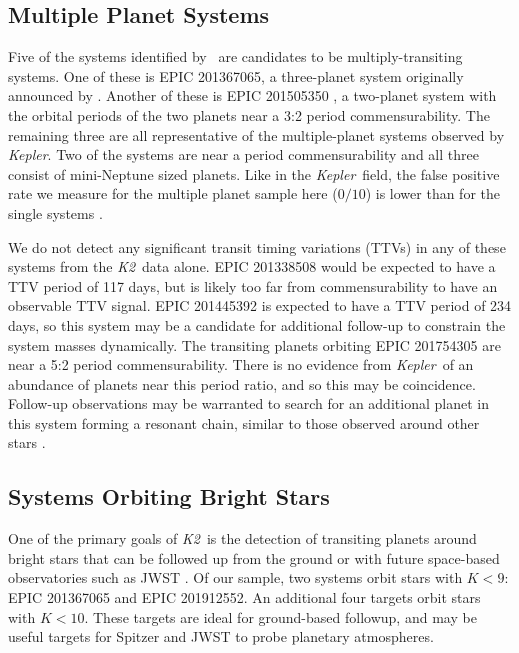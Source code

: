 \documentclass{emulateapj}
\newcommand{\project}[1]{\textsl{#1}}
\newcommand{\kep}{\project{Kepler}}
\newcommand{\KT}{\project{K2}}
\newcommand{\paperit}{\citet{Foreman-Mackey15}}
\begin{document}
\subsection{Multiple Planet Systems}
Five of the systems identified by \paperit\ are candidates to be multiply-transiting
systems.
One of these is EPIC 201367065, a three-planet system originally announced by
\citet{Crossfield15}.
Another of these is EPIC 201505350 \citep{Armstrong15b}, a two-planet system with the
orbital periods of the two planets near a 3:2 period commensurability.
The remaining three are all representative of the multiple-planet systems observed by
\kep \citep{Lissauer11b, Fabrycky14}.
Two of the systems are near a period commensurability and all three consist of
mini-Neptune sized planets.
Like in the \kep\ field, the false positive rate we measure for the multiple planet sample
here ($0/10$) is lower than for the single systems \citep{Lissauer12, Rowe14}.


We do not detect any significant transit timing variations (TTVs) in any of these systems from
the \KT\ data alone.
EPIC 201338508 would be expected to have a TTV period of 117 days, but
is likely too far from commensurability to have an observable TTV signal.
EPIC 201445392 is expected to have a TTV period of 234 days, so this system may be a candidate
for additional follow-up to constrain the system masses dynamically.
The transiting planets orbiting EPIC 201754305 are near a 5:2 period commensurability.
There is no evidence from \kep\ of an abundance of planets near this period ratio, and so this
may be coincidence.
Follow-up observations may be warranted to search for an additional planet in this system
forming a resonant chain, similar to those observed around other stars \citep[e.g.][]{Swift13,
Campante15}.

\subsection{Systems Orbiting Bright Stars}

One of the primary goals of \KT\ is the detection of transiting planets around bright stars that
can be followed up from the ground or with future space-based observatories such as JWST
\citep{Howell14}.
Of our sample, two systems orbit stars with $K < 9$: EPIC 201367065 \citep{Crossfield15} and
EPIC 201912552.
An additional four targets orbit stars with $K <10$.
These targets are ideal for ground-based followup, and may be useful targets for Spitzer and
JWST to probe planetary atmospheres.
\end{document}
